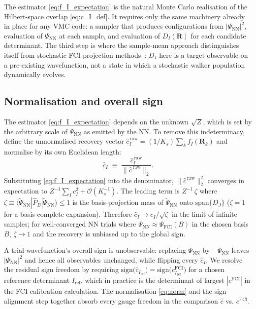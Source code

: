 \documentclass[journal=jctcce,manuscript=article,layout=traditional]{achemso}
\begin{document}
The estimator \eqref{eq:f_I_expectation} is the natural Monte Carlo
realisation of the Hilbert-space overlap
\eqref{eq:c_I_def}. It requires only the same machinery already in
place for any VMC code: a sampler that produces configurations from
$|\Psi_{\mathrm{NN}}|^2$, evaluation of $\Psi_{\mathrm{NN}}$ at each
sample, and evaluation of $D_I(\mathbf{R})$ for each candidate
determinant. The third step is where the sample-mean approach
distinguishes itself from stochastic FCI projection
methods~\cite{Booth2009FCIQMC,Holmes2016HCI,Tubman2020ASCI}: $D_I$ here
is a target observable on a pre-existing wavefunction, not a state in
which a stochastic walker population dynamically evolves.

\subsection{Normalisation and overall sign}
\label{sec:normalization}

The estimator \eqref{eq:f_I_expectation} depends on the unknown
$\sqrt{Z}$, which is set by the arbitrary scale of
$\Psi_{\mathrm{NN}}$ as emitted by the NN. To remove this
indeterminacy, define the unnormalised recovery vector
$\widehat{c}_I^{\,\text{raw}} = (1/K_s) \sum_k f_I(\mathbf{R}_k)$ and
normalise by its own Euclidean length:
\begin{equation}
\widehat{c}_I \;\equiv\;
\frac{\widehat{c}_I^{\,\text{raw}}}{\bigl\|\widehat{c}^{\,\text{raw}}\bigr\|_2}.
\label{eq:norm}
\end{equation}
Substituting \eqref{eq:f_I_expectation} into the denominator,
$\|\widehat{c}^{\,\text{raw}}\|_2^2$ converges in expectation to
$Z^{-1} \sum_I c_I^2 + \mathcal{O}(K_s^{-1})$. The leading term is
$Z^{-1}\,\zeta$ where
$\zeta \equiv \langle \widetilde{\Psi}_{\mathrm{NN}} | \widehat{P}_{\!B}
  | \widetilde{\Psi}_{\mathrm{NN}} \rangle \le 1$
is the basis-projection mass of $\widetilde{\Psi}_{\mathrm{NN}}$ onto
$\mathrm{span}\{D_J\}$ ($\zeta = 1$ for a basis-complete expansion).
Therefore
$\widehat{c}_I \to c_I / \sqrt{\zeta}$ in the limit of infinite
samples; for well-converged NN trials where
$\Psi_{\mathrm{NN}} \approx \Psi_{\mathrm{FCI}}(B)$ in the chosen basis
$B$, $\zeta \to 1$ and the recovery is unbiased up to the global sign.

A trial wavefunction's overall sign is unobservable: replacing
$\Psi_{\mathrm{NN}}$ by $-\Psi_{\mathrm{NN}}$ leaves $|\Psi_{\mathrm{NN}}|^2$
and hence all observables unchanged, while flipping every
$\widehat{c}_I$. We resolve the residual sign freedom by requiring
$\mathrm{sign}\bigl(\widehat{c}_{I_{\text{ref}}}\bigr) =
\mathrm{sign}\bigl(c^{\mathrm{FCI}}_{I_{\text{ref}}}\bigr)$ for a
chosen reference determinant $I_{\text{ref}}$, which in practice is
the determinant of largest $|c^{\mathrm{FCI}}|$ in the FCI calibration
calculation. The normalisation \eqref{eq:norm} and the sign-alignment
step together absorb every gauge freedom in the comparison
$\widehat{c}$ vs. $c^{\mathrm{FCI}}$.
\end{document}
